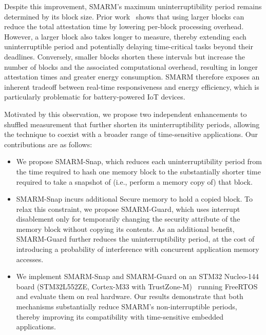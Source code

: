 \documentclass[conference]{IEEEtran}
\newcommand{\smarmcopy}{SMARM-Snap\xspace}
\newcommand{\smarmlock}{SMARM-Guard\xspace}
\begin{document}
Despite this improvement, SMARM's maximum uninterruptibility period remains determined by its block size. Prior work~\cite{smarmplus2026,carpent2018smarm} shows that using larger blocks can reduce the total attestation time by lowering per-block processing overhead. However, a larger block also takes longer to measure, thereby extending each uninterruptible period and potentially delaying time-critical tasks beyond their deadlines. Conversely, smaller blocks shorten these intervals but increase the number of blocks and the associated computational overhead, resulting in longer attestation times and greater energy consumption. SMARM therefore exposes an inherent tradeoff between real-time responsiveness and energy efficiency, which is particularly problematic for battery-powered IoT devices.


Motivated by this observation, we propose two independent enhancements to shuffled measurement that further shorten its uninterruptibility periods, allowing the technique to coexist with a broader range of time-sensitive applications.
Our contributions are as follows:

\begin{itemize}
\item We propose \smarmcopy, which reduces each uninterruptibility period from the time required to hash one memory block to the substantially shorter time required to take a snapshot of (i.e., perform a memory copy of) that block.

 

\item \smarmcopy incurs additional Secure memory to hold a copied block. To relax this constraint, we propose \smarmlock, which uses interrupt disablement only for temporarily changing the security attribute of the memory block without copying its contents.
As an additional benefit, \smarmlock further reduces the uninterruptibility period, at the cost of introducing a probability of interference with concurrent application memory accesses.


\item We implement \smarmcopy and \smarmlock on an STM32 Nucleo-144 board (STM32L552ZE, Cortex-M33 with TrustZone-M)~\cite{stm32nucleo144} running FreeRTOS and evaluate them on real hardware. Our results demonstrate that both mechanisms substantially reduce SMARM's non-interruptible periods, thereby improving its compatibility with time-sensitive embedded applications.


\end{itemize}
\end{document}
